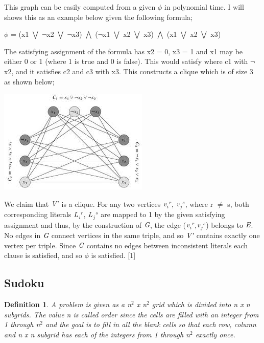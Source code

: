 \documentclass[a4paper]{report}
\newtheorem{defi}{Definition}
\begin{document}
This graph can be easily computed from a given $\phi$ in polynomial time. I will shows this as an example below given the following formula;

\vspace{3mm}
$\phi$ = (x1 $\bigvee$ $\neg$x2 $\bigvee$ $\neg$x3) $\bigwedge$ ($\neg$x1 $\bigvee$ x2 $\bigvee$ x3) $\bigwedge$ (x1 $\bigvee$ x2 $\bigvee$ x3)

\vspace{3mm}
The satisfying assignment of the formula has x2 = 0, x3 = 1 and x1 may be either 0 or 1 (where 1 is true and 0 is false). This would satisfy where c1 with $\neg$x2, and it satisfies c2 and c3 with x3. This constructs a clique which is of size 3 as shown below;

\begin{center}
\includegraphics[scale=0.60]{clique1.png}
\end{center}

We claim that $\emph{V'}$ is a clique. For any two vertices $\emph{v}$$_{i}$$^{r}$, $\emph{v}$$_{j}$$^{s}$, where r $\neq$ s, both corresponding literals $\emph{L}$$_{i}$$^{r}$, $\emph{L}$$_{j}$$^{s}$ are mapped to 1 by the given satisfying assignment and thus, by the construction of $\emph{G}$, the edge ($\emph{v}$$_{i}$$^{r}$,$\emph{v}$$_{j}$$^{s}$) belongs to $\emph{E}$. No edges in $\emph{G}$ connect vertices in the same triple, and so $\emph{V'}$ contains exactly one vertex per triple. Since $\emph{G}$ contains no edges between inconsistent literals each clause is satisfied, and so $\phi$ is satisfied. [1]

\subsection{Sudoku}

\begin{defi}
A problem is given as a n$^{2}$ x n$^{2}$ grid which is divided into n x n subgrids. The value n is called order since the cells are filled with an integer from 1 through n$^{2}$ and the goal is to fill in all the blank cells so that each row, column and n x n subgrid has each of the integers from 1 through n$^{2}$ exactly once.

\end{defi}
\end{document}

